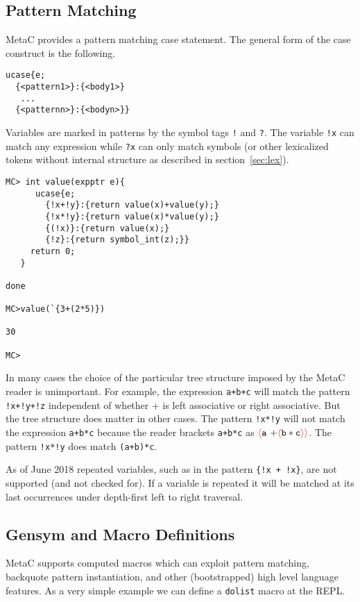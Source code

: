 \documentclass{article}
\newcommand{\fopen}{{\color{red} \langle}}
\newcommand{\fclose}{{\color{red} \rangle}}
\begin{document}
\subsection{Pattern Matching}

MetaC provides a pattern matching case statement.
The general form of the case construct is the following.

\begin{verbatim}
ucase{e;
  {<pattern1>}:{<body1>}
   ...
  {<patternn>}:{<bodyn>}}
\end{verbatim}

Variables are marked in patterns by the symbol tags {\tt !} and {\tt ?}.  The variable {\tt !x} can match any expression while {\tt ?x} can only match symbols (or other lexicalized
tokens without internal structure as described in section~\ref{sec:lex}).

\begin{verbatim}
MC> int value(expptr e){
      ucase{e;
        {!x+!y}:{return value(x)+value(y);}
        {!x*!y}:{return value(x)*value(y);}
        {(!x)}:{return value(x);}
        {!z}:{return symbol_int(z);}}
     return 0;
   }

done

MC>value(`{3+(2*5)})

30

MC>
\end{verbatim}

In many cases the choice of the particular tree structure imposed by the MetaC reader is unimportant.  For example, the expression {\tt a+b+c} will match the pattern
{\tt !x+!y+!z} independent of whether + is left associative or right associative.  But the tree structure does matter in other cases.  The pattern {\tt !x*!y}
will not match the expression {\tt a+b*c} because the reader brackets {\tt a+b*c} as  $\fopen \mathtt{a~+} \fopen \mathtt{b * c} \fclose\fclose$. The pattern {\tt !x*!y} does match {\tt (a+b)*c}.

As of June 2018 repeated variables, such as in the pattern {\tt \{!x + !x\}}, are not supported (and not checked for).
If a variable is repeated it will be matched at its last occurrences under depth-first left to right traversal.

\subsection{Gensym and Macro Definitions}

MetaC supports computed macros which can exploit pattern matching, backquote pattern instantiation, and other (bootstrapped) high level language features.
As a very simple example we can define a {\tt dolist} macro at the REPL.
\end{document}
